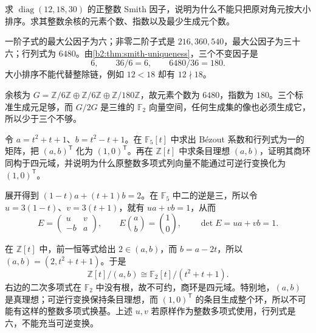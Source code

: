 \begin{exercise}\label{b2:ex:A-diagonal-invariant-factors}
	求 \(\operatorname{diag}(12,18,30)\) 的正整数 Smith 因子，说明为什么不能只把原对角元按大小排序。求其整数余核的元素个数、指数以及最少生成元个数。
\end{exercise}
\begin{solution}
	一阶子式的最大公因子为六；非零二阶子式是 \(216,360,540\)，最大公因子为三十六；行列式为 \(6480\)。由\cref{b2:thm:smith-uniqueness}，三个不变因子是
	\[
		6,\qquad36/6=6,\qquad6480/36=180.
	\]
	大小排序不能代替整除链，例如 \(12<18\) 却有 \(12\nmid18\)。

	余核为 \(G=\mathbb Z/6\mathbb Z\oplus\mathbb Z/6\mathbb Z\oplus\mathbb Z/180\mathbb Z\)，故元素个数为 \(6480\)，指数为 \(180\)。三个标准生成元足够，而 \(G/2G\) 是三维的 \(\mathbb F_2\) 向量空间，任何生成集的像也必须生成它，所以少于三个不够。
\end{solution}

\begin{exercise}\label{b2:ex:A-polynomial-bezout}
	令 \(a=t^2+t+1\)、\(b=t^2-t+1\)。在 \(\mathbb F_5[t]\) 中求出 Bézout 系数和行列式为一的矩阵，把 \((a,b)^{\mathsf T}\) 化为 \((1,0)^{\mathsf T}\)。再在 \(\mathbb Z[t]\) 中求条目理想 \((a,b)\)，证明其商环同构于四元域，并说明为什么原整数多项式列向量不能通过可逆行变换化为 \((1,0)^{\mathsf T}\)。
\end{exercise}
\begin{solution}
	展开得到 \((1-t)a+(t+1)b=2\)。在 \(\mathbb F_5\) 中二的逆是三，所以令 \(u=3(1-t)\)、\(v=3(t+1)\)，就有 \(ua+vb=1\)，从而
	\[
		E=\begin{pmatrix}u&v\\-b&a\end{pmatrix},\qquad
		E\binom ab=\binom10, \qquad\det E=ua+vb=1.
	\]

	在 \(\mathbb Z[t]\) 中，前一恒等式给出 \(2\in(a,b)\)，而 \(b=a-2t\)，所以 \((a,b)=(2,t^2+t+1)\)。于是
	\[
		\mathbb Z[t]/(a,b)\cong\mathbb F_2[t]/(t^2+t+1).
	\]
	右边的二次多项式在 \(\mathbb F_2\) 中没有根，故不可约，商环是四元域。特别地，\((a,b)\) 是真理想；可逆行变换保持条目理想，而 \((1,0)^{\mathsf T}\) 的条目生成整个环，所以不可能有这样的整数多项式换基。上述 \(u,v\) 若原样作为整数多项式使用，行列式是六，不能充当可逆变换。
\end{solution}

